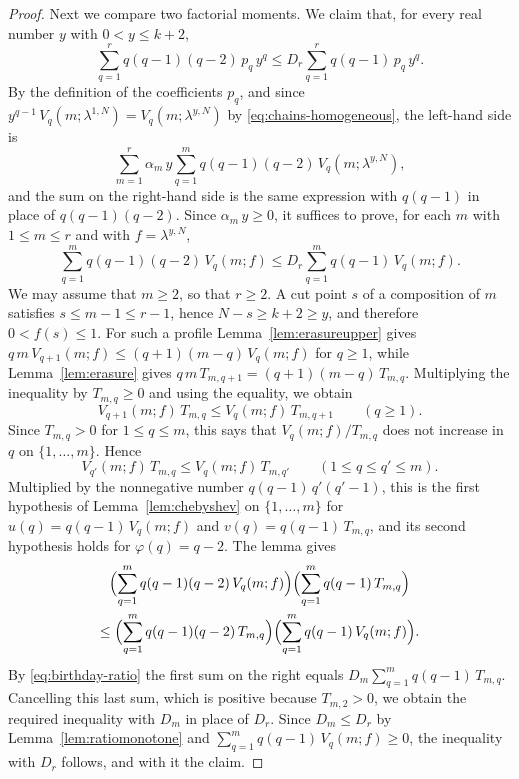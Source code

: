 \documentclass{amsart}
\theoremstyle{definition}
\theoremstyle{remark}
\numberwithin{equation}{section}
\begin{document}
\begin{proof}
Next we compare two factorial moments. We claim that, for every real number $y$ with $0<y\le k+2$,
\begin{equation}\label{eq:chains-moments}
\sum_{q=1}^{r}q(q-1)(q-2)\,p_q\,y^q\le D_r\sum_{q=1}^{r}q(q-1)\,p_q\,y^q.
\end{equation}
By the definition of the coefficients $p_q$, and since $y^{q-1}\,V_q(m;\lambda^{1,N})=V_q(m;\lambda^{y,N})$ by \eqref{eq:chains-homogeneous}, the left-hand side is
\[
\sum_{m=1}^{r}\alpha_m\,y\sum_{q=1}^{m}q(q-1)(q-2)\,V_q(m;\lambda^{y,N}),
\]
and the sum on the right-hand side is the same expression with $q(q-1)$ in place of $q(q-1)(q-2)$. Since $\alpha_m\,y\ge 0$, it suffices to prove, for each $m$ with $1\le m\le r$ and with $f=\lambda^{y,N}$,
\[
\sum_{q=1}^{m}q(q-1)(q-2)\,V_q(m;f)\le D_r\sum_{q=1}^{m}q(q-1)\,V_q(m;f).
\]
We may assume that $m\ge 2$, so that $r\ge 2$. A cut point $s$ of a composition of $m$ satisfies $s\le m-1\le r-1$, hence $N-s\ge k+2\ge y$, and therefore $0<f(s)\le 1$. For such a profile Lemma~\ref{lem:erasureupper} gives $q\,m\,V_{q+1}(m;f)\le(q+1)(m-q)\,V_q(m;f)$ for $q\ge 1$, while Lemma~\ref{lem:erasure} gives $q\,m\,T_{m,q+1}=(q+1)(m-q)\,T_{m,q}$. Multiplying the inequality by $T_{m,q}\ge 0$ and using the equality, we obtain
\[
V_{q+1}(m;f)\,T_{m,q}\le V_q(m;f)\,T_{m,q+1}\qquad(q\ge 1).
\]
Since $T_{m,q}>0$ for $1\le q\le m$, this says that $V_q(m;f)/T_{m,q}$ does not increase in $q$ on $\{1,\dots,m\}$. Hence
\[
V_{q'}(m;f)\,T_{m,q}\le V_q(m;f)\,T_{m,q'}\qquad(1\le q\le q'\le m).
\]
Multiplied by the nonnegative number $q(q-1)\,q'(q'-1)$, this is the first hypothesis of Lemma~\ref{lem:chebyshev} on $\{1,\dots,m\}$ for $u(q)=q(q-1)\,V_q(m;f)$ and $v(q)=q(q-1)\,T_{m,q}$, and its second hypothesis holds for $\varphi(q)=q-2$. The lemma gives
\begin{multline*}
\Bigl(\sum_{q=1}^{m}q(q-1)(q-2)\,V_q(m;f)\Bigr)\Bigl(\sum_{q=1}^{m}q(q-1)\,T_{m,q}\Bigr)\\
\le\Bigl(\sum_{q=1}^{m}q(q-1)(q-2)\,T_{m,q}\Bigr)\Bigl(\sum_{q=1}^{m}q(q-1)\,V_q(m;f)\Bigr).
\end{multline*}
By \eqref{eq:birthday-ratio} the first sum on the right equals $D_m\sum_{q=1}^{m}q(q-1)\,T_{m,q}$. Cancelling this last sum, which is positive because $T_{m,2}>0$, we obtain the required inequality with $D_m$ in place of $D_r$. Since $D_m\le D_r$ by Lemma~\ref{lem:ratiomonotone} and $\sum_{q=1}^{m}q(q-1)\,V_q(m;f)\ge 0$, the inequality with $D_r$ follows, and with it the claim.


\end{proof}
\end{document}

